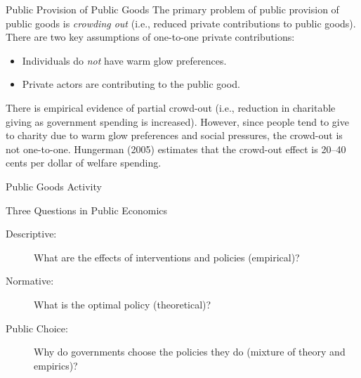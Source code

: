 \documentclass[8pt]{extarticle}
\begin{document}
  \begin{problem}{Public Provision of Public Goods}
    The primary problem of public provision of public goods is \textit{crowding out} (i.e., reduced private contributions to public goods). There are two key assumptions of one-to-one private contributions:
    \begin{itemize}
      \item Individuals do \textit{not} have warm glow preferences.
      \item Private actors are contributing to the public good.
    \end{itemize}
    There is empirical evidence of partial crowd-out (i.e., reduction in charitable giving as government spending is increased). However, since people tend to give to charity due to warm glow preferences and social pressures, the crowd-out is not one-to-one. Hungerman (2005) estimates that the crowd-out effect is 20–40 cents per dollar of welfare spending.
  \end{problem}
  \begin{problem}{Public Goods Activity}
    \begin{tcbraster}[raster columns = 1,colframe = black!75!white,colback=white]
    \end{tcbraster}
  \end{problem}
  \begin{problem}{Three Questions in Public Economics}
    \begin{description}
      \item[Descriptive:] What are the effects of interventions and policies (empirical)?
      \item[Normative:] What is the optimal policy (theoretical)?
      \item[Public Choice:] Why do governments choose the policies they do (mixture of theory and empirics)?
    \end{description}
  \end{problem}
\end{document}
